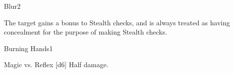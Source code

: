 \begin{spellsection}{Blur}{2}
    \begin{spellheader}
    \end{spellheader}
    \begin{spellcontent}
        \begin{spelltargetinginfo}
        \end{spelltargetinginfo}
        \begin{spelleffects}
            \spelleffect The target gains a  bonus to Stealth checks, and is always treated as having concealment for the purpose of making Stealth checks.
            \spelldur \durpersonallong
        \end{spelleffects}
    \end{spellcontent}
    \begin{spellfooter}
        \miscastrandom
    \end{spellfooter}
\end{spellsection}

\begin{spellsection}{Burning Hands}{1}
    \begin{spellheader}
    \end{spellheader}
    \begin{spellcontent}
        \begin{spelltargetinginfo}
        \end{spelltargetinginfo}
        \begin{spelleffects}
            \begin{spellattack}{Magic vs. Reflex}
                \spellsuccess {}[d6]
                \spellfailure Half damage.
            \end{spellattack}
        \end{spelleffects}
    \end{spellcontent}
    \begin{spellfooter}
        \miscastexplode
    \end{spellfooter}
\end{spellsection}

